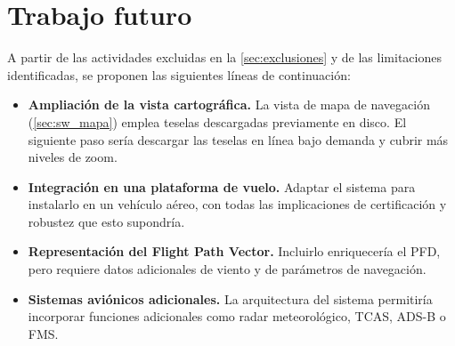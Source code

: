 \section{Trabajo futuro}
\label{sec:trabajo_futuro}

A partir de las actividades excluidas en la \cref{sec:exclusiones} y de las limitaciones identificadas, se proponen las siguientes líneas de continuación:

\begin{itemize}
    \item \textbf{Ampliación de la vista cartográfica.} La vista de mapa de navegación (\cref{sec:sw_mapa}) emplea teselas descargadas previamente en disco. El siguiente paso sería descargar las teselas en línea bajo demanda y cubrir más niveles de zoom.

    \item \textbf{Integración en una plataforma de vuelo.} Adaptar el sistema para instalarlo en un vehículo aéreo, con todas las implicaciones de certificación y robustez que esto supondría.

    \item \textbf{Representación del Flight Path Vector.} Incluirlo enriquecería el PFD, pero requiere datos adicionales de viento y de parámetros de navegación.

    \item \textbf{Sistemas aviónicos adicionales.} La arquitectura del sistema permitiría incorporar funciones adicionales como radar meteorológico, TCAS, ADS-B o FMS.
\end{itemize}